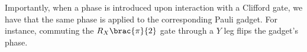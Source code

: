 Importantly, when a phase is introduced upon interaction with a Clifford gate, we have that the same phase is applied to the corresponding Pauli gadget. For instance, commuting the $R_X \brac{\pi}{2}$ gate through a $Y$ leg flips the gadget's phase.






